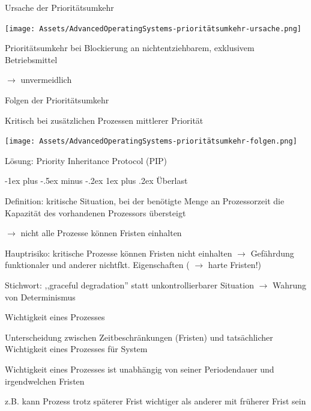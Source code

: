 \documentclass[a4paper]{article}
\makeatletter
\renewcommand{\subsubsection}{\@startsection{subsubsection}{3}{0mm}%
 {-1ex plus -.5ex minus -.2ex}%
 {1ex plus .2ex}%
 {\normalfont\small\bfseries}}
\makeatother
\begin{document}
\begin{multicols}{3}
    Ursache der Prioritätsumkehr
    \begin{itemize*}
        \item \texttt{[image: Assets/AdvancedOperatingSystems-prioritätsumkehr-ursache.png]}
        \item Prioritätsumkehr bei Blockierung an nichtentziehbarem, exklusivem Betriebsmittel
        \item $\rightarrow$ unvermeidlich
    \end{itemize*}

    Folgen der Prioritätsumkehr
    \begin{itemize*}
        \item Kritisch bei zusätzlichen Prozessen mittlerer Priorität
        \item \texttt{[image: Assets/AdvancedOperatingSystems-prioritätsumkehr-folgen.png]}
        \item Lösung: Priority Inheritance Protocol (PIP)
    \end{itemize*}

    \subsubsection{Überlast}
    \begin{itemize*}
        \item Definition: kritische Situation, bei der benötigte Menge an Prozessorzeit die Kapazität des vorhandenen Prozessors übersteigt %
        \item[$\rightarrow$] nicht alle Prozesse können Fristen einhalten
        \item Hauptrisiko: kritische Prozesse können Fristen nicht einhalten $\rightarrow$ Gefährdung funktionaler und anderer nichtfkt. Eigenschaften ( $\rightarrow$ harte Fristen!)
        \item Stichwort: ,,graceful degradation'' statt unkontrollierbarer Situation $\rightarrow$ Wahrung von Determinismus
    \end{itemize*}

    Wichtigkeit eines Prozesses
    \begin{itemize*}
        \item Unterscheidung zwischen Zeitbeschränkungen (Fristen) und tatsächlicher Wichtigkeit eines Prozesses für System
        \item Wichtigkeit eines Prozesses ist unabhängig von seiner Periodendauer und irgendwelchen Fristen
        \item z.B. kann Prozess trotz späterer Frist wichtiger als anderer mit früherer Frist sein
    \end{itemize*}


\end{multicols}
\end{document}
